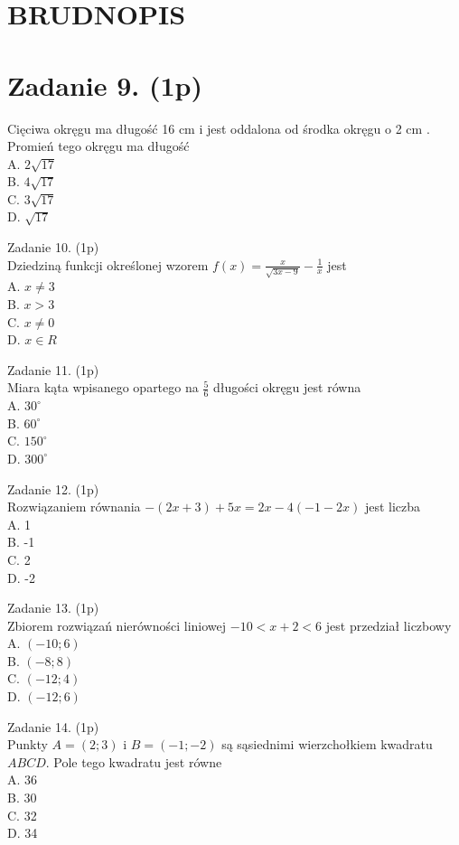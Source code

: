 \documentclass[10pt]{article}
\begin{document}
\section*{BRUDNOPIS}
\section*{Zadanie 9. (1p)}
Cięciwa okręgu ma długość 16 cm i jest oddalona od środka okręgu o 2 cm . Promień tego okręgu ma długość\\
A. \(2 \sqrt{17}\)\\
B. \(4 \sqrt{17}\)\\
C. \(3 \sqrt{17}\)\\
D. \(\sqrt{17}\)

Zadanie 10. (1p)\\
Dziedziną funkcji określonej wzorem \(f(x)=\frac{x}{\sqrt{3 x-9}}-\frac{1}{x}\) jest\\
A. \(x \neq 3\)\\
B. \(x>3\)\\
C. \(x \neq 0\)\\
D. \(x \in R\)

Zadanie 11. (1p)\\
Miara kąta wpisanego opartego na \(\frac{5}{6}\) długości okręgu jest równa\\
A. \(30^{\circ}\)\\
B. \(60^{\circ}\)\\
C. \(150^{\circ}\)\\
D. \(300^{\circ}\)

Zadanie 12. (1p)\\
Rozwiązaniem równania \(-(2 x+3)+5 x=2 x-4(-1-2 x)\) jest liczba\\
A. 1\\
B. -1\\
C. 2\\
D. -2

Zadanie 13. (1p)\\
Zbiorem rozwiązań nierówności liniowej \(-10<x+2<6\) jest przedział liczbowy\\
A. \((-10 ; 6)\)\\
B. \((-8 ; 8)\)\\
C. \((-12 ; 4)\)\\
D. \((-12 ; 6)\)

Zadanie 14. (1p)\\
Punkty \(A=(2 ; 3)\) i \(B=(-1 ;-2)\) są sąsiednimi wierzchołkiem kwadratu \(A B C D\). Pole tego kwadratu jest równe\\
A. 36\\
B. 30\\
C. 32\\
D. 34
\end{document}
